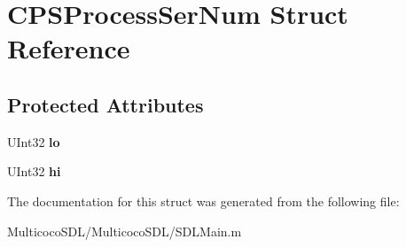 \hypertarget{struct_c_p_s_process_ser_num}{\section{C\-P\-S\-Process\-Ser\-Num Struct Reference}
\label{struct_c_p_s_process_ser_num}
}
\subsection*{Protected Attributes}
\begin{DoxyCompactItemize}
\item 
\hypertarget{struct_c_p_s_process_ser_num_a7b6592ad5ec45fc2d77ba8f323a76afc}{U\-Int32 {\bfseries lo}}\label{struct_c_p_s_process_ser_num_a7b6592ad5ec45fc2d77ba8f323a76afc}

\item 
\hypertarget{struct_c_p_s_process_ser_num_ae052a7253c1a9b8c2c79a3053761f82c}{U\-Int32 {\bfseries hi}}\label{struct_c_p_s_process_ser_num_ae052a7253c1a9b8c2c79a3053761f82c}

\end{DoxyCompactItemize}


The documentation for this struct was generated from the following file\-:\begin{DoxyCompactItemize}
\item 
Multicoco\-S\-D\-L/\-Multicoco\-S\-D\-L/S\-D\-L\-Main.\-m\end{DoxyCompactItemize}
